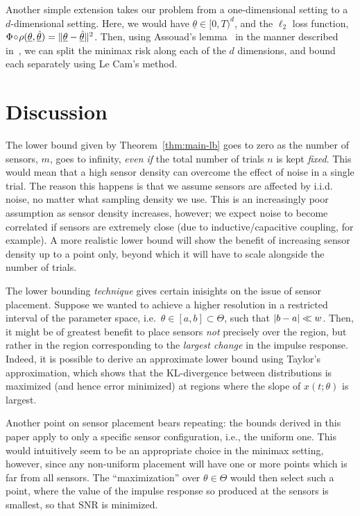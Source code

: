 \documentclass[conference]{IEEEtran}
\providecommand{\v}{}
\renewcommand{\v}[1]{\underline{#1}}
\providecommand{\vhat}{}
\renewcommand{\vhat}[1]{\underline{\hat{#1}}}
\DeclarePairedDelimiter\abs{\lvert}{\rvert}
\DeclarePairedDelimiter\norm{\lVert}{\rVert}
\newcommand{\Phiorho}{\Phi\!\circ\!\rho}
\begin{document}
Another simple extension takes our problem from a one-dimensional setting to a
$d$-dimensional setting. Here, we would have $\v\theta \in [0, T)^d$, and the
$\ell_2$ loss function, $\Phiorho(\v\theta, \vhat\theta) = \norm{\v\theta -
\vhat\theta}^2$. Then, using Assouad's lemma~\cite{Tsybakov2009Introduction} in
the manner described in~\cite{Duchi2015Information}, we can split the minimax
risk along each of the $d$ dimensions, and bound each separately using Le Cam's
method.

\section{Discussion}
\label{sec:discussion}

The lower bound given by Theorem~\ref{thm:main-lb} goes to zero as the number
of sensors, $m$, goes to infinity, \emph{even if} the total number of trials
$n$ is kept \emph{fixed}. This would mean that a high sensor density can
overcome the effect of noise in a single trial. The reason this happens is that
we assume sensors are affected by i.i.d. noise, no matter what sampling density
we use. This is an increasingly poor assumption as sensor density increases,
however; we expect noise to become correlated if sensors are extremely close
(due to inductive/capacitive coupling, for example). A more realistic lower
bound will show the benefit of increasing sensor density up to a point only,
beyond which it will have to scale alongside the number of trials.

The lower bounding \emph{technique} gives certain inisights on the issue of
sensor placement. Suppose we wanted to achieve a higher resolution in a
restricted interval of the parameter space, i.e.\ $\theta \in [a, b] \subset
\Theta$, such that $\abs{b - a} \ll w$. Then, it might be of greatest benefit
to place sensors \emph{not} precisely over the region, but rather in the region
corresponding to the \emph{largest change} in the impulse response. Indeed, it
is possible to derive an  approximate lower bound using Taylor's approximation,
which shows that the KL-divergence between distributions is maximized (and
hence error minimized) at regions where the slope of $x(t;\theta)$ is largest.

Another point on sensor placement bears repeating: the bounds derived in this
paper apply to only a specific sensor configuration, i.e., the uniform one.
This would intuitively seem to be an appropriate choice in the minimax setting,
however, since any non-uniform placement will have one or more points which is
far from all sensors. The ``maximization'' over $\theta \in \Theta$ would then
select such a point, where the value of the impulse response so produced at the
sensors is smallest, so that SNR is minimized.
\end{document}
